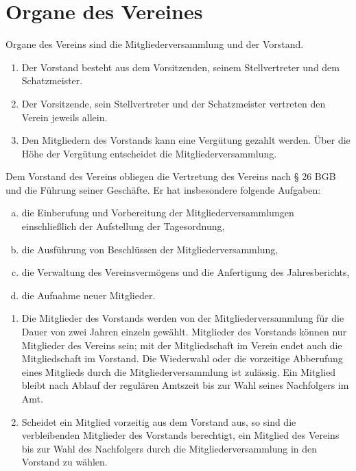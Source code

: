 \documentclass{scrartcl}
\begin{document}
\section{Organe des Vereines}
\begin{contract}
\Clause[title={Organe des Vereins}]
Organe des Vereins sind die Mitgliederversammlung und der Vorstand.

\Clause[title={Vorstand}]
\begin{enumerate}
    \item Der Vorstand besteht aus dem Vorsitzenden, seinem Stellvertreter und dem Schatzmeister.
    \item Der Vorsitzende, sein Stellvertreter und der Schatzmeister vertreten den Verein jeweils allein.
    \item Den Mitgliedern des Vorstands kann eine Vergütung gezahlt werden. Über die Höhe der Vergütung entscheidet die Mitgliederversammlung.
\end{enumerate}

\Clause[title={Aufgaben des Vorstands}]
Dem Vorstand des Vereins obliegen die Vertretung des Vereins nach § 26 BGB und die
Führung seiner Geschäfte. Er hat insbesondere folgende Aufgaben: 
\begin{enumerate}[(a)]
    \item die Einberufung und Vorbereitung der Mitgliederversammlungen einschließlich der Aufstellung der Tagesordnung,
    \item die Ausführung von Beschlüssen der Mitgliederversammlung,
    \item die Verwaltung des Vereinsvermögens und die Anfertigung des Jahresberichts,
    \item die Aufnahme neuer Mitglieder.
\end{enumerate} 

\Clause[title={Bestellung des Vorstands}]
\begin{enumerate}
    \item Die Mitglieder des Vorstands werden von der Mitgliederversammlung für die Dauer von zwei Jahren einzeln gewählt. Mitglieder des Vorstands können nur Mitglieder des Vereins sein; mit der Mitgliedschaft im Verein endet auch die Mitgliedschaft im Vorstand. Die Wiederwahl oder die vorzeitige Abberufung eines Mitglieds durch die Mitgliederversammlung    ist zulässig. Ein Mitglied bleibt nach Ablauf der regulären Amtszeit bis zur Wahl seines Nachfolgers im Amt.
    \item Scheidet ein Mitglied vorzeitig aus dem Vorstand aus, so sind die verbleibenden Mitglieder des Vorstands berechtigt, ein Mitglied des Vereins bis zur Wahl des Nachfolgers durch die Mitgliederversammlung in den Vorstand zu wählen.
\end{enumerate}


\end{contract}
\end{document}
